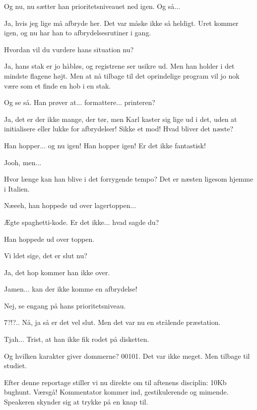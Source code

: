 \documentclass[a4paper,11pt]{article}
\begin{document}
\begin{sketch}
   Og nu, nu sætter han prioritetsniveauet ned igen.  Og så...

   Ja, hvis jeg lige må afbryde her.  Det var måske ikke så
  heldigt.  Uret kommer igen, og nu har han to afbrydelsesrutiner i
  gang.

   Hvordan vil du vurdere hans situation nu?

   Ja, hans stak er jo håbløs, og registrene ser usikre ud.
  Men han holder i det mindste flagene højt.  Men at nå tilbage til
  det oprindelige program vil jo nok være som et finde en hob i en
  stak.

   Og se så.  Han prøver at... formattere... printeren?

   Ja, det er der ikke mange, der tør, men Karl kaster sig
  lige ud i det, uden at initialisere eller lukke for afbrydelser!
  Sikke et mod!  Hvad bliver det næste?

   Han hopper... og nu igen!  Han hopper igen!  Er det ikke fantastisk!

   Jooh, men...

   Hvor længe kan han blive i det forrygende tempo?  Det er næsten ligesom hjemme i Italien.

   Næeeh, han hoppede ud over lagertoppen...

   Ægte spaghetti-kode.  Er det ikke... hvad sagde du?

   Han hoppede ud over toppen.

   Vi ldet sige, det er slut nu?

   Ja, det hop kommer han ikke over.

   Jamen... kan der ikke komme en afbrydelse!

   Nej, se engang på hans prioritetsniveau.

   7?!?.. Nå, ja så er det vel slut.  Men det var nu en
  strålende præstation.

   Tjah... Trist, at han ikke fik rodet på disketten.

   Og hvilken karakter giver dommerne?  00101.  Det var ikke
  meget.  Men tilbage til studiet.


   Efter denne reportage stiller vi nu direkte om til aftenens
  disciplin: 10Kb bughunt.  Værsgå!   Kommentator
  kommer ind, gestikulerende og mimende.  Speakeren skynder sig at
  trykke på en knap til.


\end{sketch}
\end{document}

